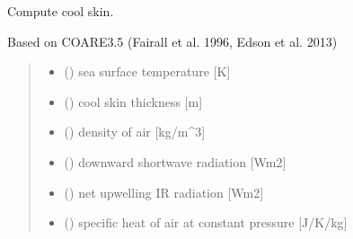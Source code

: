 \documentclass[letterpaper,10pt,english]{sphinxmanual}
\begin{document}
\begin{fulllineitems}
\label{\detokenize{users_guide:cs_wl_subs.cs}}
\pysigstartsignatures
{}
\pysigstopsignatures
\sphinxAtStartPar
Compute cool skin.

\sphinxAtStartPar
Based on COARE3.5 (Fairall et al. 1996, Edson et al. 2013)
\begin{quote}\begin{description}
\begin{itemize}
\item {} 
\sphinxAtStartPar
{} () \textendash{} sea surface temperature      {[}K{]}

\item {} 
\sphinxAtStartPar
{} () \textendash{} cool skin thickness           {[}m{]}

\item {} 
\sphinxAtStartPar
{} () \textendash{} density of air               {[}kg/m\textasciicircum{}3{]}

\item {} 
\sphinxAtStartPar
{} () \textendash{} downward shortwave radiation {[}Wm\sphinxhyphen{}2{]}

\item {} 
\sphinxAtStartPar
{} () \textendash{} net upwelling IR radiation       {[}Wm\sphinxhyphen{}2{]}

\item {} 
\sphinxAtStartPar
{} () \textendash{} specific heat of air at constant pressure {[}J/K/kg{]}


\end{itemize}
\end{description}
\end{quote}
\end{fulllineitems}
\end{document}
